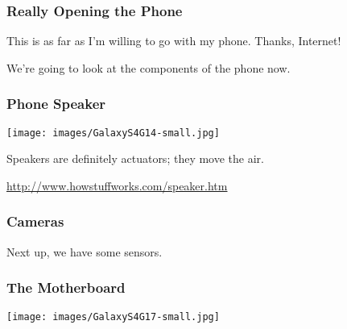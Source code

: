 \begin{frame}
\frametitle{Really Opening the Phone}

\vspace*{1em}
This is as far as I'm willing to go with my phone. Thanks, Internet!

\begin{center}
\end{center}

We're going to look at the components of the phone now.

\end{frame}

\begin{frame}
\frametitle{Phone Speaker}

\begin{center}
\texttt{[image: images/GalaxyS4G14-small.jpg]}
\end{center}

\hspace*{3em}Speakers are definitely actuators; they move the air.
\begin{center}
\url{http://www.howstuffworks.com/speaker.htm}
\end{center}

\end{frame}

\begin{frame}
\frametitle{Cameras}
Next up, we have some sensors.

\begin{center}
\end{center}

\end{frame}

\begin{frame}
\frametitle{The Motherboard}

\begin{center}
\texttt{[image: images/GalaxyS4G17-small.jpg]}
\end{center}


\end{frame}

